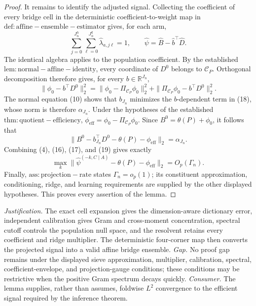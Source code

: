 \documentclass{article}
\begin{document}
\begin{proof}
It remains to identify the adjusted signal.  Collecting the coefficient of every bridge cell in the deterministic coefficient-to-weight map in \(\mathrm{def:affine-ensemble-estimator}\) gives, for each arm,
\[
 \sum_{j=0}^{J_n^h}\sum_{\ell=0}^{J_n^q}\widehat\lambda_{a,j\ell}=1,
 \qquad
 \widehat\psi=\widehat B-\widehat b^\top\widehat D.                     \tag{17}
\]
The identical algebra applies to the population coefficient.  By the established \(\mathrm{lem:normal-affine-identity}\), every coordinate of \(D^0\) belongs to \(\mathcal C_P\).  Orthogonal decomposition therefore gives, for every \(b\in\mathbb R^{J_n}\),
\[
 \|\phi_0-b^\top D^0\|_2^2
 =\|\phi_0-\Pi_{\mathcal C_P}\phi_0\|_2^2
  +\|\Pi_{\mathcal C_P}\phi_0-b^\top D^0\|_2^2.                         \tag{18}
\]
The normal equation (10) shows that \(b_{J_n}\) minimizes the \(b\)-dependent term in (18), whose norm is therefore \(\alpha_{J_n}\).  Under the hypotheses of the established \(\mathrm{thm:quotient-efficiency}\),
\(\phi_{\mathrm{eff}}=\phi_0-\Pi_{\mathcal C_P}\phi_0\).  Since \(B^0=\theta(P)+\phi_0\), it follows that
\[
 \|B^0-b_{J_n}^\top D^0-\theta(P)-\phi_{\mathrm{eff}}\|_2
 =\alpha_{J_n}.                                                             \tag{19}
\]
Combining (4), (16), (17), and (19) gives exactly
\[
 \max_k\|\widehat\psi^{(-k,C\mid A)}-\theta(P)-\phi_{\mathrm{eff}}\|_2
 =O_p(\Gamma_n).
\]
Finally, \(\mathrm{ass:projection-rate}\) states \(\Gamma_n=o_p(1)\); its constituent approximation, conditioning, ridge, and learning requirements are supplied by the other displayed hypotheses.  This proves every assertion of the lemma.
\end{proof}
\par\smallskip\noindent \textit{Justification.} The exact cell expansion gives the dimension-aware dictionary error, independent calibration gives Gram and cross-moment concentration, spectral cutoff controls the population null space, and the resolvent retains every coefficient and ridge multiplier. The deterministic four-corner map then converts the projected signal into a valid affine bridge ensemble. \textit{Gap.} No proof gap remains under the displayed sieve approximation, multiplier, calibration, spectral, coefficient-envelope, and projection-gauge conditions; these conditions may be restrictive when the positive Gram spectrum decays quickly. \textit{Consumer.} The lemma supplies, rather than assumes, foldwise \(L^2\) convergence to the efficient signal required by the inference theorem.
\end{document}
